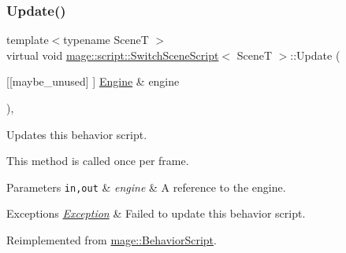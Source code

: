 \subsubsection{\texorpdfstring{Update()}{Update()}}
{\footnotesize\ttfamily template$<$typename SceneT $>$ \\
virtual void \mbox{\hyperlink{classmage_1_1script_1_1_switch_scene_script}{mage\+::script\+::\+Switch\+Scene\+Script}}$<$ SceneT $>$\+::Update (\begin{DoxyParamCaption}\item[{\mbox{[}\mbox{[}maybe\+\_\+unused\mbox{]} \mbox{]} \mbox{\hyperlink{classmage_1_1_engine}{Engine}} \&}]{engine }\end{DoxyParamCaption})\hspace{0.3cm}{\ttfamily [override]}, {\ttfamily [virtual]}}

Updates this behavior script.

This method is called once per frame.


\begin{DoxyParams}[1]{Parameters}
\mbox{\tt in,out}  & {\em engine} & A reference to the engine. \\
\hline
\end{DoxyParams}

\begin{DoxyExceptions}{Exceptions}
{\em \mbox{\hyperlink{classmage_1_1_exception}{Exception}}} & Failed to update this behavior script. \\
\hline
\end{DoxyExceptions}


Reimplemented from \mbox{\hyperlink{classmage_1_1_behavior_script_a085634661326b59850c1111e537baa4e}{mage\+::\+Behavior\+Script}}.

